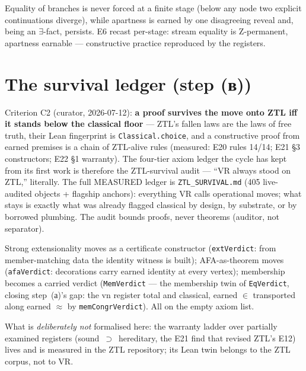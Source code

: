 \begin{theorem}
\label{thm:setsztl_streams}
\leanok
{}
Equality of branches is never forced at a finite stage (below any node two
explicit continuations diverge), while apartness is earned by one
disagreeing reveal and, being an $\exists$-fact, persists.  E6 recast
per-stage: stream equality is Z-permanent, apartness earnable ---
constructive practice reproduced by the registers.
\end{theorem}

\section{The survival ledger (step (в))}
\label{sec:setsztl_survival}

Criterion C2 (curator, 2026-07-12): \textbf{a proof survives the move onto
ZTL iff it stands below the classical floor} — ZTL's fallen laws are the laws
of free truth, their Lean fingerprint is \texttt{Classical.choice}, and a
constructive proof from earned premises is a chain of ZTL-alive rules
(measured: E20 rules 14/14; E21 §3 constructors; E22 §1 warranty). The
four-tier axiom ledger the cycle has kept from its first work is therefore
the ZTL-survival audit — ``VR always stood on ZTL,'' literally.  The full
MEASURED ledger is \texttt{ZTL\_SURVIVAL.md} (405 live-audited objects +
flagship anchors): everything VR calls operational moves; what stays is
exactly what was already flagged classical by design, by substrate, or by
borrowed plumbing.  The audit bounds proofs, never theorems (auditor, not
separator).

\begin{theorem}
\label{thm:setsztl_survival}
\leanok
{}
Strong extensionality moves as a certificate constructor
(\texttt{extVerdict}: from member-matching data the identity witness is
built); AFA-as-theorem moves (\texttt{afaVerdict}: decorations carry earned
identity at every vertex); membership becomes a carried verdict
(\texttt{MemVerdict} — the membership twin of \texttt{EqVerdict}, closing
step~(а)'s gap: the vn register total and classical, earned $\in$
transported along earned $\approx$ by \texttt{memCongrVerdict}).  All on the
empty axiom list.
\end{theorem}

What is \emph{deliberately not} formalised here: the warranty ladder over
partially examined registers (sound~$\supset$~hereditary, the E21 find that
revised ZTL's E12) lives and is measured in the ZTL repository; its Lean twin
belongs to the ZTL corpus, not to VR.
